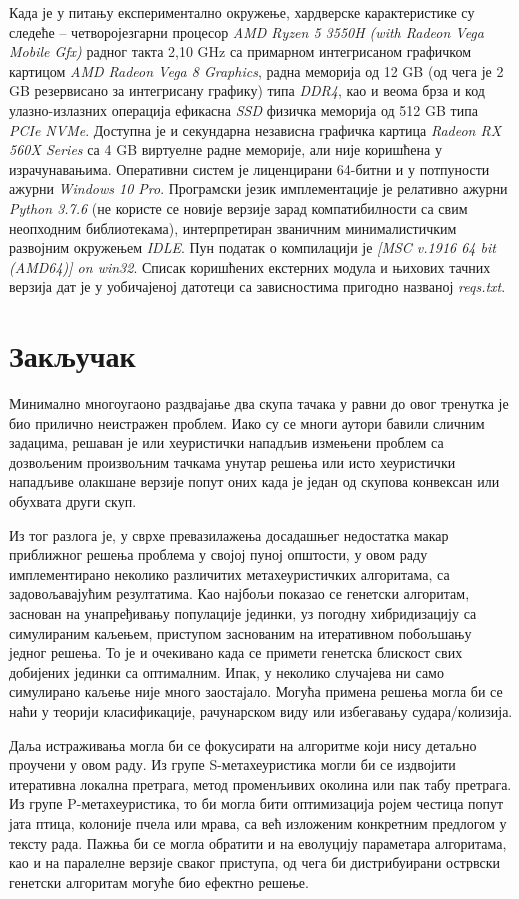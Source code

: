 \documentclass[a4paper]{article}
\begin{document}
Када је у питању експериментално окружење, хардверске карактеристике су следеће -- четворојезгарни процесор \textit{AMD Ryzen 5 3550H (with Radeon Vega Mobile Gfx)} радног такта 2,10 GHz са примарном интегрисаном графичком картицом \textit{AMD Radeon Vega 8 Graphics}, радна меморија од 12 GB (од чега је 2 GB резервисано за интегрисану графику) типа \textit{DDR4}, као и веома брза и код улазно-излазних операција ефикасна \textit{SSD} физичка меморија од 512 GB типа \textit{PCIe NVMe}. Доступна је и секундарна независна графичка картица \textit{Radeon RX 560X Series} са 4 GB виртуелне радне меморије, али није коришћена у израчунавањима. Оперативни систем је лиценцирани 64-битни и у потпуности ажурни \textit{Windows 10 Pro}. Програмски језик имплементације је релативно ажурни \textit{Python 3.7.6} (не користе се новије верзије зарад компатибилности са свим неопходним библиотекама), интерпретиран званичним минималистичким развојним окружењем \textit{IDLE}. Пун податак о компилацији је \textit{[MSC v.1916 64 bit (AMD64)] on win32}. Списак коришћених екстерних модула и њихових тачних верзија дат је у уобичајеној датотеци са зависностима пригодно названој \textit{reqs.txt}.

\section{Закључак}

Минимално многоугаоно раздвајање два скупа тачака у равни до овог тренутка је био прилично неистражен проблем. Иако су се многи аутори бавили сличним задацима, решаван је или хеуристички нападљив измењени проблем са дозвољеним произвољним тачкама унутар решења или исто хеуристички нападљиве олакшане верзије попут оних када је један од скупова конвексан или обухвата други скуп.

Из тог разлога је, у сврхе превазилажења досадашњег недостатка макар приближног решења проблема у својој пуној општости, у овом раду имплементирано неколико различитих метахеуристичких алгоритама, са задовољавајућим резултатима. Као најбољи показао се генетски алгоритам, заснован на унапређивању популације јединки, уз погодну хибридизацију са симулираним каљењем, приступом заснованим на итеративном побољшању једног решења. То је и очекивано када се примети генетска блискост свих добијених јединки са оптималним. Ипак, у неколико случајева ни само симулирано каљење није много заостајало. Могућа примена решења могла би се наћи у теорији класификације, рачунарском виду или избегавању судара/колизија.

Даља истраживања могла би се фокусирати на алгоритме који нису детаљно проучени у овом раду. Из групе S-метахеуристика могли би се издвојити итеративна локална претрага, метод променљивих околина или пак табу претрага. Из групе P-метахеуристика, то би могла бити оптимизација ројем честица попут јата птица, колоније пчела или мрава, са већ изложеним конкретним предлогом у тексту рада. Пажња би се могла обратити и на еволуцију параметара алгоритама, као и на паралелне верзије сваког приступа, од чега би дистрибуирани острвски генетски алгоритам могуће био ефектно решење.

\newpage
{}
\appendix


\end{document}
